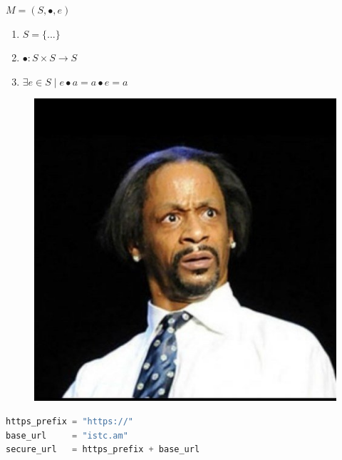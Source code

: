 \documentclass[aspectratio=169]{beamer}
\begin{document}
\begin{frame}
    \centering
        \Huge
            $M = (S, \bullet, e)$
\end{frame}

\begin{frame}
    \Huge
        \begin{enumerate}[ leftmargin=1.5em
                         , itemsep=1em
                         , labelsep=0.5em
                         , label=\color{darkelectricblue}\Roman*
                         ]
            \item $S = \{...\}$
            \item $\bullet : S \times S \to S$
            \item $\exists e \in S \mid e \bullet a = a \bullet e = a$
        \end{enumerate}
\end{frame}

\begin{frame}
    \centering
        \begin{figure}[b]
            \includegraphics[scale=0.51]{img/what.jpg}
        \end{figure}
\end{frame}

\begin{frame}[fragile,t]
    \begin{lstlisting}[language=Python]
https_prefix = "https://"
base_url     = "istc.am"
secure_url   = https_prefix + base_url
    \end{lstlisting}
\end{frame}
\end{document}
